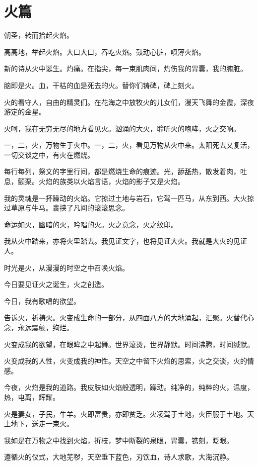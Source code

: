 \documentclass[UTF8]{article}
\begin{document}
\section{火篇}
\par 朝圣，转而拾起火焰。
\par 高高地，举起火焰。大口大口，吞吃火焰。鼓动心脏，喷薄火焰。
\par 新的诗从火中诞生。灼痛。在指尖，每一束肌肉间，灼伤我的胃囊，我的腑脏。
\par 脑即是火。血，干枯的血是死去的火。替你们铸碑，碑上刻火。
\par 火的看守人，自由的精灵们。在花海之中放牧火的儿女们，漫天飞舞的金霞，深夜游定的金星。
\par 火呵，我在无穷无尽的地方看见火。汹涌的大火，聆听火的咆哮，火之交响。
\par 一，二，火，万物生于火中。一，二，火，看见万物从火中来。太阳死去又复活，一切交谈之中，有火在燃烧。
\par 每行每列，祭文的字里行间，都是燃烧生命的痕迹。光，舔舐热，散发着肉，吐息，颤栗。火焰的族类以火焰言语，火焰的影子又是火焰。
\par 我的灵魂是一抔躁动的火焰。它掠过土地与岩石，它驾一匹马，从东到西。大火掠过草原与牛马。裹挟了凡间的滚滚思念。
\par 命运如火，幽暗的火，吟唱的火。火之意念，火之纹印。
\par 我从火中踏来，亦将火里踏去。我见证文字，也将见证大火。我就是大火的见证人。
\par 时光是火，从漫漫的时空之中召唤火焰。
\par 今日要见证火之诞生，火之创造。
\\[0.6cm]
\par 今日，我有歌唱的欲望。
\par 告诉火，祈祷火。火变成生命的一部分，从四面八方的大地涌起，汇聚。火替代心念，永远震颤，绚烂。
\par 火变成我的欲望，在眼眸之中起舞。世界滚烫，世界静默。时间沸腾，时间缄默。
\par 火变成我的人性，火变成我的神性。天空之中留下火焰的思索，火之交谈，火的情感。
\par 今夜，火焰是我的道路。我皮肤如火焰般透明，躁动。纯净的，纯粹的火，温度，热，电离，辉耀。
\par 火是妻女，子民，牛羊。火即富贵，亦即贫乏。火凌驾于土地，火臣服于土地。天上地下，送走一束火。
\par 我如是在万物之中找到火焰，折枝，梦中断裂的泉眼，胃囊，镌刻，眨眼。
\par 遵循火的仪式，大地芜秽，天空垂下蓝色，刃饮血，诗人求歌，大海沉静。
\end{document}
